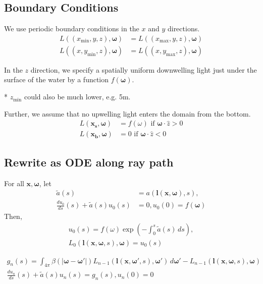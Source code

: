 \documentclass[10pt]{article}
\newcommand\abs[1]{\left| #1 \right|}
\newcommand\xmin{x_{\mbox{min}}}
\newcommand\xmax{x_{\mbox{max}}}
\newcommand\ymin{y_{\mbox{min}}}
\newcommand\ymax{y_{\mbox{max}}}
\newcommand\zmin{z_{\mbox{min}}}
\renewcommand\vec{\mathbf}
\begin{document}
\subsection{Boundary Conditions}

We use periodic boundary conditions in the $x$ and $y$ directions.
\begin{align}
  L\left((\xmin, y, z), \vec{\omega}\right) &= L\left((\xmax, y, z), \vec{\omega}\right) \\
  L\left((x, \ymin, z), \vec{\omega}\right) &= L\left((x, \ymax, z), \vec{\omega}\right)
\end{align}

In the $z$ direction, we specify a spatially uniform downwelling light just
under the surface of the water by a function $f(\vec{\omega})$.

* $\zmin$ could also be much lower, e.g. 5m.

Further, we assume that no upwelling light enters the domain from the bottom.
\begin{align}
  L(\vec{x_s}, \vec{\omega}) &= f(\omega) \mbox{ if } \vec{\omega} \cdot \hat{z} > 0\\ 
  L(\vec{x_b}, \vec{\omega}) &= 0 \mbox { if } \vec{\omega} \cdot \hat{z} < 0
\end{align}
 
\subsection{Rewrite as ODE along ray path}
For all $\vec{x}, \vec{\omega}$, let
\begin{align}
  \tilde{a}(s) &= a(\vec{l}(\vec{x}, \vec{\omega}), s), \\ 
  \frac{du_0}{ds}(s) + \tilde{a}(s) u_0(s) &= 0, u_0(0) = f(\vec{\omega})
\end{align}
Then,
\begin{align}
  u_0(s) = f(\omega) \exp\left(-\int_0^s \tilde{a}(s)\, ds\right), \\
  L_0(\vec{l}(\vec{x}, \vec{\omega},s), \vec{\omega}) = u_0(s)
\end{align}

\begin{align}
  g_n(s) = \int_{4\pi} \beta(\abs{\vec{\omega} - \vec{\omega}'})
  L_{n-1}(\vec{l}(\vec{x}, \vec{\omega'}, s), \vec{\omega}')\,d\vec{\omega}' - L_{n-1}(\vec{l}(\vec{x}, \vec{\omega}, s), \vec{\omega}) \\ 
  \frac{du_n}{ds}(s) + \tilde{a}(s)u_n(s) = g_n(s), u_n(0) = 0
\end{align}
\end{document}
